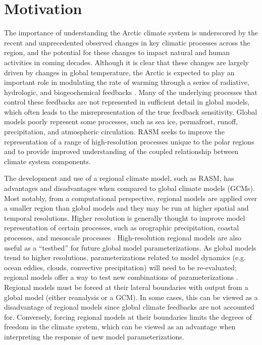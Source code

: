\section{Motivation}

The importance of understanding the Arctic climate system is underscored by the recent and unprecedented observed changes in key climatic processes across the region, and the potential for these changes to impact natural and human activities in coming decades.
Although it is clear that these changes are largely driven by changes in global temperature, the Arctic is expected to play an important role in modulating the rate of warming through a series of radiative, hydrologic, and biogeochemical feedbacks \citep[e.g. ][]{Holland_2003}.
Many of the underlying processes that control these feedbacks are not represented in sufficient detail in global models, which often leads to the misrepresentation of the true feedback sensitivity.
Global models poorly represent some processes, such as sea ice, permafrost, runoff, precipitation, and atmospheric circulation.
RASM seeks to improve the representation of a range of high-resolution processes unique to the polar regions and to provide improved understanding of the coupled relationship between climate system components.

The development and use of a regional climate model, such as RASM, has advantages and disadvantages when compared to global climate models (GCMs).
Most notably, from a computational perspective, regional models are applied over a smaller region than global models and they may be run at higher spatial and temporal resolutions.
Higher resolution is generally thought to improve model representation of certain processes, such as orographic precipitation, coastal processes, and mesoscale processes \citep{Feser_2011}.
High-resolution regional models are also useful as a ``testbed'' for future global model parameterizations.
As global models trend to higher resolutions, parameterizations related to model dynamics (e.g. ocean eddies, clouds, convective precipitation) will need to be re-evaluated; regional models offer a way to test new combinations of parameterizations \citep[e.g. ][]{Roberts_2015a,Cassano_2016}.
Regional models must be forced at their lateral boundaries with output from a global model (either reanalysis or a GCM).
In some cases, this can be viewed as a disadvantage of regional models since global climate feedbacks are not accounted for.
Conversely, forcing regional models at their boundaries limits the degrees of freedom in the climate system, which can be viewed as an advantage when interpreting the response of new model parameterizations.

